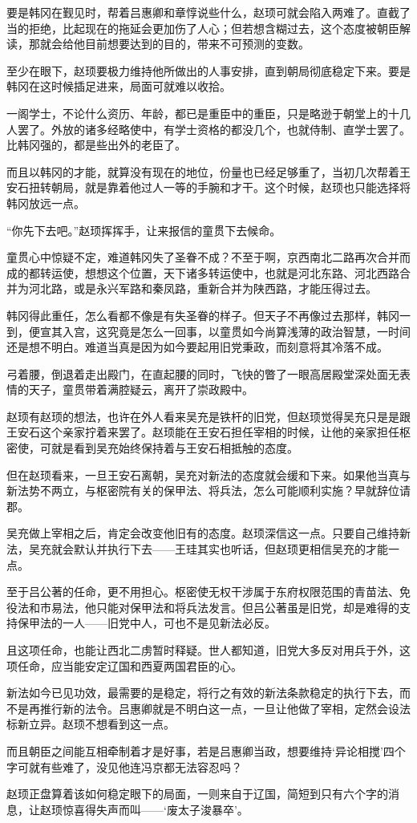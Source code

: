 要是韩冈在觐见时，帮着吕惠卿和章惇说些什么，赵顼可就会陷入两难了。直截了当的拒绝，比起现在的拖延会更加伤了人心；但若想含糊过去，这个态度被朝臣解读，那就会给他目前想要达到的目的，带来不可预测的变数。

至少在眼下，赵顼要极力维持他所做出的人事安排，直到朝局彻底稳定下来。要是韩冈在这时候插足进来，局面可就难以收拾。

一阁学士，不论什么资历、年龄，都已是重臣中的重臣，只是略逊于朝堂上的十几人罢了。外放的诸多经略使中，有学士资格的都没几个，也就侍制、直学士罢了。比韩冈强的，都是些出外的老臣了。

而且以韩冈的才能，就算没有现在的地位，份量也已经足够重了，当初几次帮着王安石扭转朝局，就是靠着他过人一等的手腕和才干。这个时候，赵顼也只能选择将韩冈放远一点。

“你先下去吧。”赵顼挥挥手，让来报信的童贯下去候命。

童贯心中惊疑不定，难道韩冈失了圣眷不成？不至于啊，京西南北二路再次合并而成的都转运使，想想这个位置，天下诸多转运使中，也就是河北东路、河北西路合并为河北路，或是永兴军路和秦凤路，重新合并为陕西路，才能压得过去。

韩冈得此重任，怎么看都不像是有失圣眷的样子。但天子不再像过去那样，韩冈一到，便宣其入宫，这究竟是怎么一回事，以童贯如今尚算浅薄的政治智慧，一时间还是想不明白。难道当真是因为如今要起用旧党秉政，而刻意将其冷落不成。

弓着腰，倒退着走出殿门，在直起腰的同时，飞快的瞥了一眼高居殿堂深处面无表情的天子，童贯带着满腔疑云，离开了崇政殿中。

赵顼有赵顼的想法，也许在外人看来吴充是铁杆的旧党，但赵顼觉得吴充只是是跟王安石这个亲家拧着来罢了。赵顼能在王安石担任宰相的时候，让他的亲家担任枢密使，可就是看到吴充始终保持着与王安石相抵触的态度。

但在赵顼看来，一旦王安石离朝，吴充对新法的态度就会缓和下来。如果他当真与新法势不两立，与枢密院有关的保甲法、将兵法，怎么可能顺利实施？早就辞位请郡。

吴充做上宰相之后，肯定会改变他旧有的态度。赵顼深信这一点。只要自己维持新法，吴充就会默认并执行下去——王珪其实也听话，但赵顼更相信吴充的才能一点。

至于吕公著的任命，更不用担心。枢密使无权干涉属于东府权限范围的青苗法、免役法和市易法，他只能对保甲法和将兵法发言。但吕公著虽是旧党，却是难得的支持保甲法的一人——旧党中人，可也不是见新法必反。

且这项任命，也能让西北二虏暂时释疑。世人都知道，旧党大多反对用兵于外，这项任命，应当能安定辽国和西夏两国君臣的心。

新法如今已见功效，最需要的是稳定，将行之有效的新法条款稳定的执行下去，而不是再推行新的法令。吕惠卿就是不明白这一点，一旦让他做了宰相，定然会设法标新立异。赵顼不想看到这一点。

而且朝臣之间能互相牵制着才是好事，若是吕惠卿当政，想要维持‘异论相搅’四个字可就有些难了，没见他连冯京都无法容忍吗？

赵顼正盘算着该如何稳定眼下的局面，一则来自于辽国，简短到只有六个字的消息，让赵顼惊喜得失声而叫——‘废太子浚暴卒’。


